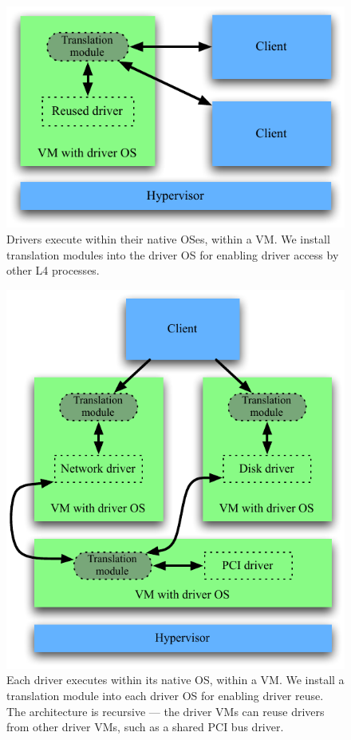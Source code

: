 \documentclass[10pt,a4paper]{article}
\begin{document}
\begin{figure}[tb]
  \centering
  \includegraphics{figures/translation-module.pdf}
  \caption[Translation module for driver reuse.]{Drivers execute
  within their native OSes, within a VM.  We install translation
  modules into the driver OS for enabling driver access by other L4
  processes.}
  \label{fig:driver_translation_module}
\end{figure}

\begin{figure}[tb]
  \centering
  \includegraphics{figures/isolated-drivers.pdf}
  \caption[Isolated, reused drivers.]{Each driver executes within
  its native OS, within a VM.  We install a translation
  module into each driver OS for enabling driver reuse.  The
  architecture is recursive --- the driver VMs can reuse drivers from
  other driver VMs, such as a shared PCI bus driver.}
  \label{fig:driver_isolation}
\end{figure}
\end{document}
